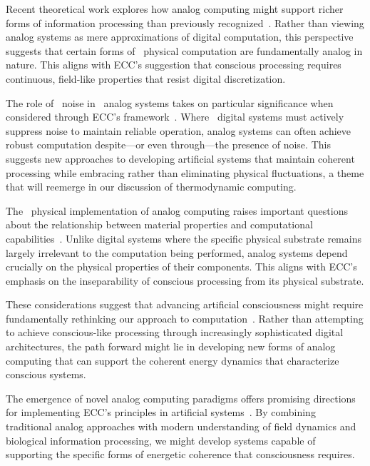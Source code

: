 Recent theoretical work explores how analog computing might support richer forms of information processing than previously recognized~\cite{Cowan2017, Verschure2019}. Rather than viewing analog systems as mere approximations of digital computation, this perspective suggests that certain forms of~ physical computation are fundamentally analog in nature. This aligns with ECC's suggestion that conscious processing requires continuous, field-like properties that resist digital discretization.

The role of~ noise in~ analog systems takes on particular significance when considered through ECC's framework~\cite{Davies2019, Raychowdhury2020}. Where~ digital systems must actively suppress noise to maintain reliable operation, analog systems can often achieve robust computation despite—or even through—the presence of noise. This suggests new approaches to developing artificial systems that maintain coherent processing while embracing rather than eliminating physical fluctuations, a theme that will reemerge in our discussion of thermodynamic computing.

The~ physical implementation of analog computing raises important questions about the relationship between material properties and computational capabilities~\cite{Dewdney1984, Stepney2018}. Unlike digital systems where the specific physical substrate remains largely irrelevant to the computation being performed, analog systems depend crucially on the physical properties of their components. This aligns with ECC's emphasis on the inseparability of conscious processing from its physical substrate.

These considerations suggest that advancing artificial consciousness might require fundamentally rethinking our approach to computation~\cite{Earman1993, Wegner2003}. Rather than attempting to achieve conscious-like processing through increasingly sophisticated digital architectures, the path forward might lie in developing new forms of analog computing that can support the coherent energy dynamics that characterize conscious systems.

The emergence of novel analog computing paradigms offers promising directions for implementing ECC's principles in artificial systems~\cite{Ambainis2015, Benjamin2019}. By combining traditional analog approaches with modern understanding of field dynamics and biological information processing, we might develop systems capable of supporting the specific forms of energetic coherence that consciousness requires.

